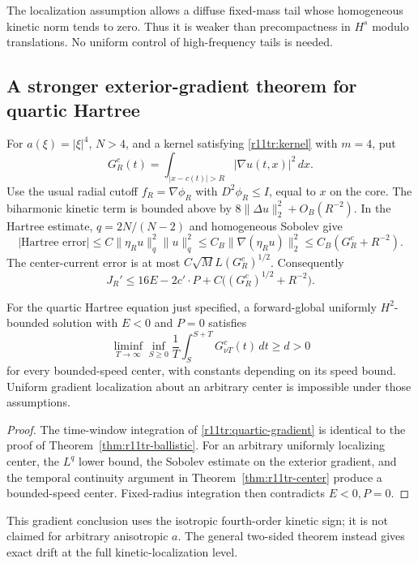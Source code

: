 The localization assumption allows a diffuse fixed-mass tail whose
homogeneous kinetic norm tends to zero. Thus it is weaker than
precompactness in $H^s$ modulo translations. No uniform control of
high-frequency tails is needed.

\subsection{A stronger exterior-gradient theorem for quartic Hartree}

For $a(\xi)=|\xi|^4$, $N>4$, and a kernel satisfying
\eqref{r11tr:kernel} with $m=4$, put
\[
 G_R^c(t)=\int_{|x-c(t)|>R}|\nabla u(t,x)|^2\,dx.
\]
Use the usual radial cutoff $f_R=\nabla\phi_R$ with
$D^2\phi_R\le I$, equal to $x$ on the core. The biharmonic
kinetic term is bounded above by
$8\|\Delta u\|_2^2+O_B(R^{-2})$. In the Hartree estimate,
$q=2N/(N-2)$ and homogeneous Sobolev give
\[
 |\text{Hartree error}|
 \le C\|\eta_Ru\|_q^2\|u\|_q^2
 \le C_B\|\nabla(\eta_Ru)\|_2^2
 \le C_B(G_R^c+R^{-2}).
\]
The center-current error is at most
$C\sqrt M L(G_R^c)^{1/2}$. Consequently
\begin{equation}\label{r11tr:quartic-gradient}
 J_R'\le16E-2c'\cdot P+C\bigl((G_R^c)^{1/2}+R^{-2}\bigr).
\end{equation}

\begin{corollary}
For the quartic Hartree equation just specified, a forward-global
uniformly $H^2$-bounded solution with $E<0$ and $P=0$ satisfies
\[
 \liminf_{T\to\infty}\inf_{S\ge0}\frac1T
 \int_S^{S+T}G_{\nu T}^c(t)\,dt\ge d>0
\]
for every bounded-speed center, with constants depending on its speed
bound. Uniform gradient localization about an arbitrary center is
impossible under those assumptions.
\end{corollary}
\begin{proof}
The time-window integration of \eqref{r11tr:quartic-gradient}
is identical to the proof of Theorem~\ref{thm:r11tr-ballistic}.
For an arbitrary uniformly localizing center, the $L^q$ lower bound,
the Sobolev estimate on the exterior gradient, and the temporal
continuity argument in Theorem~\ref{thm:r11tr-center} produce a
bounded-speed center. Fixed-radius integration then contradicts
$E<0,P=0$.
\end{proof}

This gradient conclusion uses the isotropic fourth-order kinetic sign;
it is not claimed for arbitrary anisotropic $a$. The general two-sided
theorem instead gives exact drift at the full kinetic-localization
level.

